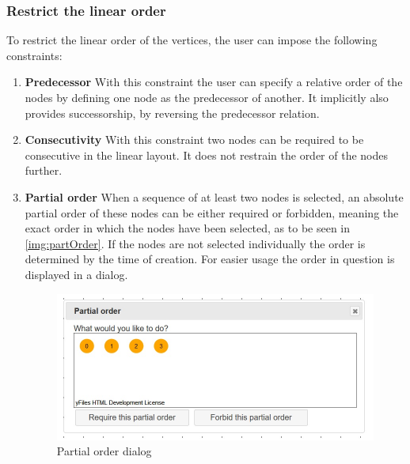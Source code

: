 \subsubsection{Restrict the linear order}
To restrict the linear order of the vertices, the user can impose the following constraints:
\begin{enumerate}
\item \textbf{Predecessor}
With this constraint the user can specify a relative order of the nodes by defining one node as the predecessor of another. It implicitly also provides successorship, by reversing the predecessor relation.
\item \textbf{Consecutivity} With this constraint two nodes can be required to be consecutive in the linear layout. It does not restrain the order of the nodes further.
\item \textbf{Partial order} When a sequence of at least two nodes is selected, an absolute partial order of these nodes can be either required or forbidden, meaning the exact order in which the nodes have been selected, as to be seen in \autoref{img:partOrder}. If the nodes are not selected individually the order is determined by the time of creation. For easier usage the order in question is displayed in a dialog. 
\begin{figure}
\begin{center}
\includegraphics[width=\textwidth]{figures/figIndex/PartialOrder.jpg}
\caption{Partial order dialog}
\label{img:partOrder}
\end{center}
\end{figure}
\end{enumerate}
\newpage
